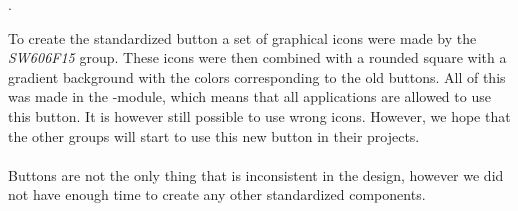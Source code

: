 .

To create the standardized button a set of graphical icons were made by the \emph{SW606F15} group. These icons were then combined with a rounded square with a gradient background with the colors corresponding to the old buttons. All of this was made in the -module, which means that all applications are allowed to use this button. It is however still possible to use wrong icons. However, we hope that the other groups will start to use this new button in their projects.
\\\\
Buttons are not the only thing that is inconsistent in the design, however we did not have enough time to create any other standardized components. 
